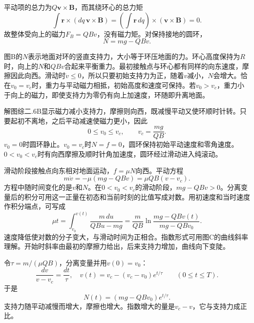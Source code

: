 \documentclass[UTF8,fontset=fandol,a4paper,11pt]{ctexart}
\newcommand{\figcaption}[1]{\par\vspace{2pt}{\small\color{muted}#1}\par}
\begin{document}
平动项的总力为$Q\boldsymbol v\times\boldsymbol B$，而其绕环心的总力矩
\[
\int\boldsymbol r\times(dq\,\boldsymbol v\times\boldsymbol B)
=\left(\int\boldsymbol r\,dq\right)\times
(\boldsymbol v\times\boldsymbol B)=0.
\]
故整体受向上的磁力$F_B=QBv$，没有磁力矩。对保持接地的圆环，
\[
\boxed{N=mg-QBv}.
\]
\begin{center}\begin{minipage}{.98\linewidth}\centering
{}
\figcaption{解图综二.6B\quad 整体竖直平衡、向西摩擦与向东平动。}
\end{minipage}\end{center}
图B的$N$表示地面对环的竖直支持力，大小等于环压地面的力。环心高度保持为$R$时，向上的$N$和$QBv$合起来平衡重力。最初接触点与环心都有同样的向东速度，摩擦因此向西。滑动时$\dot v\le0$，所以只要初始支持力为正，随着$v$减小，$N$会增大。恰在$v_0=v_c$时，重力与平动磁力相抵，初始高度和速度可保持。若$v_0>v_c$，重力小于向上的磁力，即使支持力为零仍有向上加速度，环随即升离地面。

解图综二.6B显示磁力减小支持力，摩擦则向西，既减慢平动又使环顺时针转。只要起初不离地，之后平动减速使磁力更小，因此
\[
\boxed{0\leq v_0\leq v_c,\qquad v_c=\frac{mg}{QB}}.
\]
$v_0=0$时圆环静止。$v_0=v_c$时$N=f=0$，圆环保持初始平动速度和零角速度。$0<v_0<v_c$时有向西摩擦及顺时针角加速度，圆环经过滑动进入纯滚动。

滑动阶段接触点向东相对地面运动，$f=\mu N$向西。平动方程
\[
m\dot v=-\mu(mg-QBv)
=\mu QB(v-v_c).
\]
方程中随时间变化的是$v$和$N$。在$0<v_0<v_c$的滑动阶段，$mg-QBv>0$。分离变量后的积分可用这一正量在初态和当前时刻的比值写成对数。用初速度和当时速度作积分端点，可写成
\[
\mu t=\int_{v_0}^{v(t)}\frac{m\,du}{QBu-mg}
=\frac{m}{QB}\ln\frac{mg-QBv(t)}{mg-QBv_0}.
\]
速度降低使对数的分子变大，与滑动时间为正相合。指数形式可用图C的曲线斜率理解。开始时斜率由最初的摩擦力给出，后来支持力增加，曲线向下变陡。

令$\tau=m/(\mu QB)$，分离变量并用$v(0)=v_0$：
\[
\frac{dv}{v-v_c}=\frac{dt}{\tau},
\quad
\boxed{v(t)=v_c-(v_c-v_0)e^{t/\tau}}\qquad(0\leq t\leq T).
\]
于是
\[
\boxed{N(t)=(mg-QBv_0)e^{t/\tau}}.
\]
支持力随平动减慢而增大，摩擦也增大。指数增大的量是$v_c-v$，它与支持力成正比。
\end{document}
